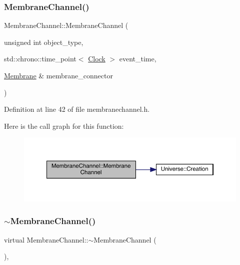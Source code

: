 \subsubsection{\texorpdfstring{Membrane\+Channel()}{MembraneChannel()}\hspace{0.1cm}{\footnotesize\ttfamily [4/4]}}
{\footnotesize\ttfamily Membrane\+Channel\+::\+Membrane\+Channel (\begin{DoxyParamCaption}\item[{unsigned int}]{object\+\_\+type,  }\item[{std\+::chrono\+::time\+\_\+point$<$ \mbox{\hyperlink{universe_8h_a0ef8d951d1ca5ab3cfaf7ab4c7a6fd80}{Clock}} $>$}]{event\+\_\+time,  }\item[{\mbox{\hyperlink{class_membrane}{Membrane}} \&}]{membrane\+\_\+connector }\end{DoxyParamCaption})\hspace{0.3cm}{\ttfamily [inline]}}



Definition at line 42 of file membranechannel.\+h.

Here is the call graph for this function\+:\nopagebreak
\begin{figure}[H]
\begin{center}
\leavevmode
\includegraphics[width=350pt]{class_membrane_channel_ac467743cbdebcdc6a77ad5ea0527e6f0_cgraph}
\end{center}
\end{figure}
\mbox{\label{class_membrane_channel_a925e7e98530ef9cc94616ea7a4dd0cbd}} 
\subsubsection{\texorpdfstring{$\sim$\+Membrane\+Channel()}{~MembraneChannel()}}
{\footnotesize\ttfamily virtual Membrane\+Channel\+::$\sim$\+Membrane\+Channel (\begin{DoxyParamCaption}{ }\end{DoxyParamCaption})\hspace{0.3cm}{\ttfamily [inline]}, {\ttfamily [virtual]}}

